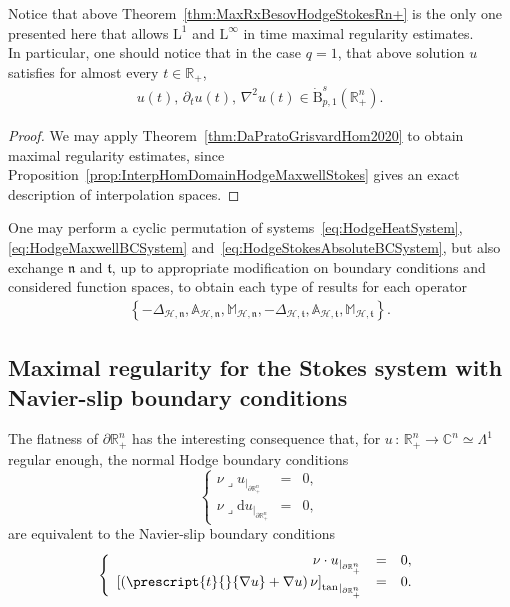 \documentclass[AHL,Unicode,longabstracts,published]{cedram}
\newcommand{\bbA}{\mathbb{A}}
\newcommand{\bbR}{\mathbb{R}}
\newcommand{\bbC}{\mathbb{C}}
\newcommand{\bbM}{\mathbb{M}}
\newcommand{\rmB}{\mathrm{B}}
\newcommand{\rmd}{\mathrm{d}}
\newcommand{\rmL}{\mathrm{L}}
\newcommand{\rtan}{\mathrm{tan}}
\newcommand{\clH}{\mathcal{H}}
\newcommand{\fkn}{\mathfrak{n}}
\newcommand{\fkt}{\mathfrak{t}}
\newcommand{\iprod}{\mathbin{\lrcorner}}
\begin{document}
\begin{rema}
Notice that above Theorem~\ref{thm:MaxRxBesovHodgeStokesRn+} is the only one presented here that allows $\rmL^1$ and $\rmL^\infty$ in time maximal regularity estimates.\\
In particular, one should notice that in the case $q=1$, that above solution $u$ satisfies for almost every $t\in\bbR_+$,
\begin{align*}
u(t),\,\partial_t u(t),\, \nabla^2 u(t) \in \dot{\rmB}^{s}_{p,1}(\bbR^n_+).
\end{align*}
\end{rema}

\begin{proof}
We may apply Theorem~\ref{thm:DaPratoGrisvardHom2020} to obtain maximal regularity estimates, since Proposition~\ref{prop:InterpHomDomainHodgeMaxwellStokes} gives an exact description of interpolation spaces.
\end{proof}

\begin{rema}
One may perform a cyclic permutation of systems~\eqref{eq:HodgeHeatSystem}, \eqref{eq:HodgeMaxwellBCSystem} and~\eqref{eq:HodgeStokesAbsoluteBCSystem}, but also exchange $\fkn$ and $\fkt$, up to appropriate modification on boundary conditions and considered function spaces, to obtain each type of results for each operator
\begin{align*}
\left\{-\Delta_{\clH,\fkn},\bbA_{\clH,\fkn},\bbM_{\clH,\fkn},-\Delta_{\clH,\fkt},\bbA_{\clH,\fkt},\bbM_{\clH,\fkt}\right\} .
\end{align*}
\end{rema}


\subsection{Maximal regularity for the Stokes system with Navier-slip boundary conditions}\label{sec:NaviernoSlipBCRn+}

The flatness of $\partial\bbR^n_+$ has the interesting consequence that, for $u\,:\,\bbR^n_+\longrightarrow\bbC^n\simeq \Lambda^1$ regular enough, the normal Hodge boundary conditions
\begin{equation*}
\left\{
\begin{array}{rcl}
\nu \iprod u_{|_{\partial\bbR^n_+}}& = & 0,\\
\nu\iprod \rmd u_{|_{\partial\bbR^n_+}}& = & 0,
\end{array}
\right.
\end{equation*}
are equivalent to the Navier-slip boundary conditions
\begin{equation}\label{eq:NavierSlipBCs}
\left\{
\begin{array}{rcl}
\nu \cdot u_{|_{\partial\bbR^n_+}}& = & 0,\\
{\left[ \left(\prescript{t}{}{{\nabla u}} + \nabla u\right)\nu \right]_{\rtan}}_{|_{\partial\bbR^n_+}} & = & 0.
\end{array}
\right.
\end{equation}
\end{document}
